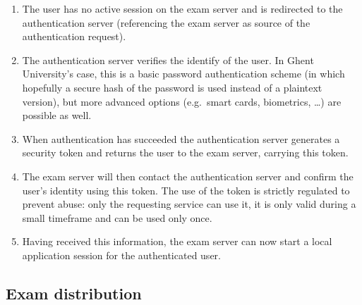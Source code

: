 \documentclass[12pt]{article}
\begin{document}
\begin{enumerate}

\item The user has no active session on the exam server and is redirected to the
authentication server (referencing the exam server as source of the
authentication request).

\item The authentication server verifies the identify of the user. In Ghent
University's case, this is a basic password authentication scheme (in which
hopefully a secure hash of the password is used instead of a plaintext version),
but more advanced options (e.g.\ smart cards, biometrics, \dots) are possible as
well.

\item When authentication has succeeded the authentication server generates a
security token and returns the user to the exam server, carrying this token.

\item The exam server will then contact the authentication server and confirm
the user's identity using this token. The use of the token is strictly regulated
to prevent abuse: only the requesting service can use it, it is only valid
during a small timeframe and can be used only once.

\item Having received this information, the exam server can now start a local
application session for the authenticated user.

\end{enumerate}

\subsection{Exam distribution}
\label{subsec:impl-exams}


\end{document}
